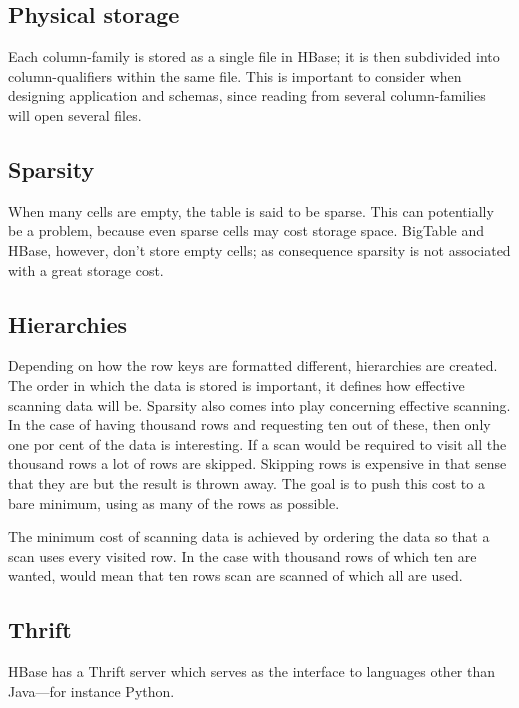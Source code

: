 \subsection*{Physical storage}

Each column-family is stored as a single file in HBase; it is then subdivided
into column-qualifiers within the same file. This is important to consider when
designing application and schemas, since reading from several column-families
will open several files.


\subsection*{Sparsity}

When many cells are empty, the table is said to be sparse. This can potentially
be a problem, because even sparse cells may cost storage space.  BigTable and
HBase, however, don't store empty cells; as consequence sparsity is not
associated with a great storage cost.
\cite{olap_data_scalability,olap_solutions}


\subsection*{Hierarchies}

Depending on how the row keys are formatted different, hierarchies are created.
The order in which the data is stored is important, it defines how effective
scanning data will be. Sparsity also comes into play concerning effective
scanning. In the case of having thousand rows and requesting ten out of these,
then only one por cent of the data is interesting. If a scan would be required
to visit all the thousand rows a lot of rows are skipped. Skipping rows is
expensive in that sense that they are but the result is thrown away. The goal is
to push this cost to a bare minimum, using as many of the rows as possible.

The minimum cost of scanning data is achieved by ordering the data so that
a scan uses every visited row. In the case with thousand rows of which ten
are wanted, would mean that ten rows scan are scanned of which all are
used.


\subsection*{Thrift}

HBase has a Thrift server which serves as the interface to languages other than
Java---for instance Python.

